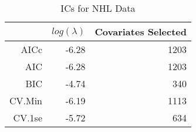 \begin{table}[ht]
\centering
\begin{tabular}{rrr}
  \hline
 & $log(\lambda)$ & Covariates Selected \\ 
  \hline
AICc & -6.28 & 1203 \\ 
  AIC & -6.28 & 1203 \\ 
  BIC & -4.74 & 340 \\ 
  CV.Min & -6.19 & 1113 \\ 
  CV.1se & -5.72 & 634 \\ 
   \hline
\end{tabular}
\caption{ICs for NHL Data} 
\label{tab:ic}
\end{table}
